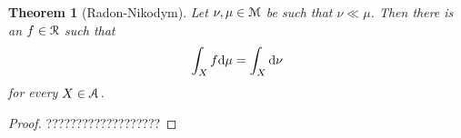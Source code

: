 \documentclass[12pt,letterpaper,oneside,reqno]{amsart}
\theoremstyle{plain}
\newtheorem{theorem}{Theorem}%
\newtheorem{fact}[theorem]{Fact}
\theoremstyle{remark}
\renewcommand*{\emph}[1]{%
   \smash{\tikz[baseline]\node[rectangle, fill=olive!25, rounded corners, inner xsep=0.5ex, inner ysep=0.2ex, anchor=base, minimum height = 2.7ex]{#1};}}
\begin{document}
\begin{theorem}[Radon-Nikodym] 
  Let $\nu,\mu\in{\EuScript M}$ be such that $\nu\ll\mu$.
  Then there is an $f\in{\EuScript R}$ such that 
  $$
  \int_X f{\rm d}\mu = \int_X {\rm d}\nu
  $$
  for every $X\in{\EuScript A}$.
\end{theorem}

\begin{proof}
  ???????????????????
\end{proof}











\end{document}
